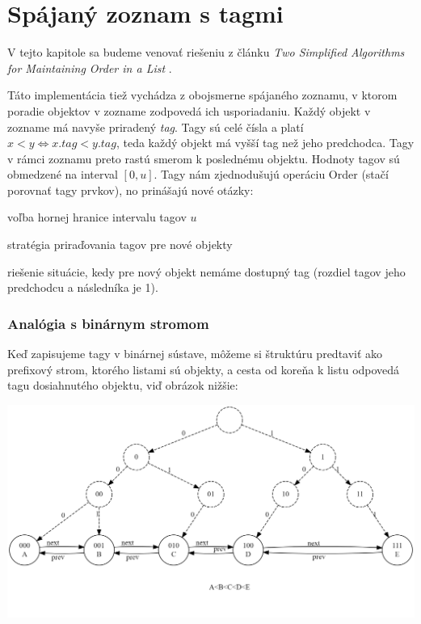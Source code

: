 \documentclass[
  digital,     %
  oneside,     %
  nosansbold,  %
  nocolorbold, %
  lof,         %
  lot,         %
]{fithesis4}
\begin{document}
\chapter{Spájaný zoznam s tagmi}

V tejto kapitole sa budeme venovať riešeniu z článku \textit{Two Simplified Algorithms for Maintaining Order in a List} \cite{paper1_ordered_list}.

Táto implementácia tiež vychádza z obojsmerne spájaného zoznamu, v ktorom poradie objektov v zozname zodpovedá ich usporiadaniu. Každý objekt v zozname má navyše priradený \textit{tag}. Tagy sú celé čísla a platí $x < y \iff x.tag < y.tag$, teda každý objekt má vyšší tag než jeho predchodca. Tagy v rámci zoznamu preto rastú smerom k poslednému objektu. Hodnoty tagov sú obmedzené na interval $[0, u]$. Tagy nám zjednodušujú operáciu Order (stačí porovnať tagy prvkov), no prinášajú nové otázky:
\begin{compactenum}
  \item voľba hornej hranice intervalu tagov $u$
  \item stratégia priraďovania tagov pre nové objekty
  \item riešenie situácie, kedy pre nový objekt nemáme dostupný tag (rozdiel tagov jeho predchodcu a následníka je 1).
\end{compactenum}

\subsection{Analógia s binárnym stromom}
Keď zapisujeme tagy v binárnej sústave, môžeme si štruktúru predtaviť ako prefixový strom, ktorého listami sú objekty, a cesta od koreňa k listu odpovedá tagu dosiahnutého objektu, viď obrázok nižšie:

\includegraphics[width=\textwidth]{graphics/graphviz.png}
\end{document}
